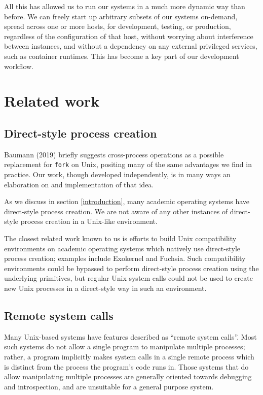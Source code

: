 \documentclass[letterpaper,twocolumn,10pt]{article}
\begin{document}
All this has allowed us to run our systems in a much more dynamic way than before.
We can freely start up arbitrary subsets of our systems on-demand,
spread across one or more hosts,
for development, testing, or production,
regardless of the configuration of that host,
without worrying about interference between instances,
and without a dependency on any external privileged services,
such as container runtimes.
This has become a key part of our development workflow.
\section{Related work}\label{related_work}
\subsection{Direct-style process creation}
Baumann (2019) briefly suggests cross-process operations as a possible replacement for \texttt{fork} on Unix,
positing many of the same advantages we find in practice.\cite{forkroad}
Our work, though developed independently,
is in many ways an elaboration on and implementation of that idea.

As we discuss in section \ref{introduction},
many academic operating systems have direct-style process creation.
We are not aware of any other instances of direct-style process creation in a Unix-like environment.

The closest related work known to us
is efforts to build Unix compatibility environments
on academic operating systems which natively use direct-style process creation;
examples include Exokernel and Fuchsia.\cite{exokernel}\cite{fuchsia_libc}
Such compatibility environments could be bypassed to perform direct-style process creation
using the underlying primitives,
but regular Unix system calls could not be used to create new Unix processes in a direct-style way
in such an environment.
\subsection{Remote system calls}\label{related}
Many Unix-based systems have features described as ``remote system calls''.
Most such systems do not allow a single program to manipulate multiple processes;
rather, a program implicitly makes system calls in a single remote process
which is distinct from the process the program's code runs in.
Those systems that do allow manipulating multiple processes
are generally oriented towards debugging and introspection,
and are unsuitable for a general purpose system.
\end{document}
